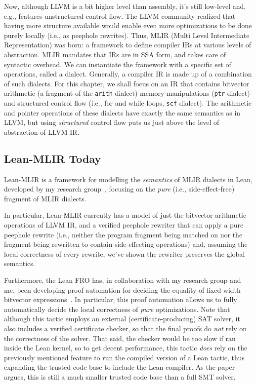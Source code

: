 \documentclass[a4paper]{scrartcl}
\begin{document}
Now, although LLVM is a bit higher level than assembly, it's still
low-level and, e.g., features unstructured control flow. The LLVM
community realized that having more structure available would enable
even more optimizations to be done purely locally (i.e., as peephole
rewrites). Thus, MLIR (Multi Level Intermediate Representation) was
born: a framework to define compiler IRs at various levels of
abstraction. MLIR mandates that IRs are in SSA form, and takes care of
syntactic overhead. We can instantiate the framework with a specific set
of operations, called a dialect. Generally, a compiler IR is made up of
a combination of such dialects. For this chapter, we shall focus on an
IR that contains bitvector arithmetic (a fragment of the \texttt{arith}
dialect) memory manipulations (\texttt{ptr} dialect) and structured
control flow (i.e., for and while loops, \texttt{scf} dialect). 
The arithmetic and pointer operations of these dialects have exactly the same semantics as in LLVM, 
but using \emph{structured} control flow puts us just above the level of abstraction of LLVM IR.

\subsection{Lean-MLIR Today}\label{Lean-MLIR-today}

Lean-MLIR is a framework for modelling the \emph{semantics} of MLIR
dialects in Lean, developed by my research group~\cite{bhatVerifyingPeepholeRewriting2024}, focusing on the
\emph{pure} (i.e., side-effect-free) fragment of MLIR dialects.

In particular, Lean-MLIR currently has a model of just the bitvector
arithmetic operations of LLVM IR, and a verified peephole rewriter that
can apply a pure peephole rewrite (i.e., neither the program fragment
being matched on nor the fragment being rewritten to contain
side-effecting operations) and, assuming the local correctness of every
rewrite, we've shown the rewriter preserves the global semantics.

Furthermore, the Lean FRO has, in collaboration with my research group
and me, been developing proof automation for deciding the equality
of fixed-width bitvector expressions~\cite{bovingTamingBitvectorBestiary}. In
particular, this proof automation allows us to fully automatically
decide the local correctness of \emph{pure} optimizations. Note that
although this tactic employs an external (certificate-producing) SAT
solver, it also includes a verified certificate checker, so that the
final proofs do \emph{not} rely on the correctness of the solver. That
said, the checker would be too slow if ran inside the Lean kernel, so to
get decent performance, this tactic \emph{does} rely on the previously
mentioned feature to run the compiled version of a Lean tactic, thus expanding
the trusted code base to include the Lean compiler.
As the paper argues, this is still a much smaller trusted code base than a full
SMT solver.
\end{document}
